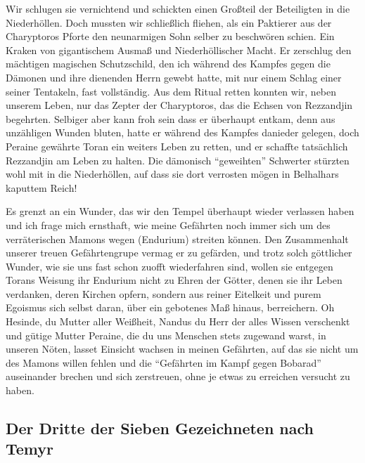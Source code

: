 Wir schlugen sie vernichtend und schickten einen Großteil der Beteiligten in die Niederhöllen. Doch mussten wir schließlich fliehen, als ein Paktierer aus der Charyptoros Pforte den neunarmigen Sohn selber zu beschwören schien. Ein Kraken von gigantischem Ausmaß und Niederhöllischer Macht. Er zerschlug den mächtigen magischen Schutzschild, den ich während des Kampfes gegen die Dämonen und ihre dienenden Herrn gewebt hatte, mit nur einem Schlag einer seiner Tentakeln, fast vollständig. Aus dem Ritual retten konnten wir, neben unserem Leben, nur das Zepter der Charyptoros, das die Echsen von Rezzandjin begehrten. Selbiger aber kann froh sein dass er überhaupt entkam, denn aus unzähligen Wunden bluten, hatte er während des Kampfes danieder gelegen, doch Peraine gewährte Toran ein weiters Leben zu retten, und er schaffte tatsächlich Rezzandjin am Leben zu halten.
Die dämonisch ``geweihten'' Schwerter stürzten wohl mit in die Niederhöllen, auf dass sie dort verrosten mögen in Belhalhars kaputtem Reich!

Es grenzt an ein Wunder, das wir den Tempel überhaupt wieder verlassen haben und ich frage mich ernsthaft, wie meine Gefährten noch immer sich um des verräterischen Mamons wegen (Endurium) streiten können. Den Zusammenhalt unserer treuen Gefährtengrupe vermag er zu gefärden, und trotz solch göttlicher Wunder, wie sie uns fast schon zuofft wiederfahren sind, wollen sie entgegen Torans Weisung ihr Endurium nicht zu Ehren der Götter, denen sie ihr Leben verdanken, deren Kirchen opfern, sondern aus reiner Eitelkeit und purem Egoismus sich selbst daran, über ein gebotenes Maß hinaus, berreichern. Oh Hesinde, du Mutter aller Weißheit, Nandus du Herr der alles Wissen verschenkt und gütige Mutter Peraine, die du uns Menschen stets zugewand warst, in unseren Nöten, lasset Einsicht wachsen in meinen Gefährten, auf das sie nicht um des Mamons willen fehlen und die ``Gefährten im Kampf gegen Bobarad'' auseinander brechen und sich zerstreuen, ohne je etwas zu erreichen versucht zu haben.

\subsection{Der Dritte der Sieben Gezeichneten nach Temyr}

